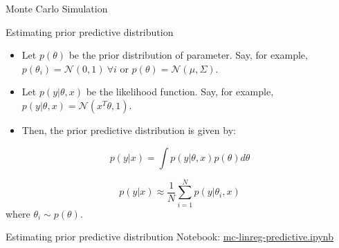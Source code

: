 \documentclass{beamer}
\begin{document}
\begin{section}{Monte Carlo Simulation}

    \begin{frame}{Estimating prior predictive distribution}
        \begin{itemize}
            \item Let $p(\theta)$ be the prior distribution of parameter. Say, for example, $p(\theta_i) = \mathcal{N}(0, 1) ~\forall i$ or $p(\theta) = \mathcal{N}(\mu, \Sigma)$.
            \pause \item Let $p(y |\theta, x)$ be the likelihood function. Say, for example, $p(y|\theta, x) = \mathcal{N}(x^T\theta, 1)$.
            \pause \item Then, the prior predictive distribution is given by:
        \end{itemize}

            \begin{equation}
                p(y|x) = \int p(y|\theta, x) p(\theta) d\theta 
            \end{equation}

            \begin{equation}
                p(y|x) \approx \frac{1}{N} \sum_{i=1}^{N} p(y|\theta_i, x)
            \end{equation}
            where $\theta_i \sim p(\theta)$.
    \end{frame}

    \begin{frame}{Estimating prior predictive distribution}
        Notebook: \url{mc-linreg-predictive.ipynb}
    \end{frame}


\end{section}
\end{document}
